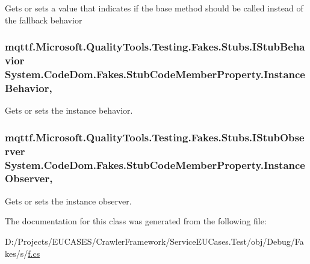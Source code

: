 Gets or sets a value that indicates if the base method should be called instead of the fallback behavior

\hypertarget{class_system_1_1_code_dom_1_1_fakes_1_1_stub_code_member_property_aa743e0a8ea935366aca0b719b1b58e38}{
\subsubsection[{Instance\-Behavior}]{\setlength{\rightskip}{0pt plus 5cm}mqttf.\-Microsoft.\-Quality\-Tools.\-Testing.\-Fakes.\-Stubs.\-I\-Stub\-Behavior System.\-Code\-Dom.\-Fakes.\-Stub\-Code\-Member\-Property.\-Instance\-Behavior\hspace{0.3cm}{\ttfamily [get]}, {\ttfamily [set]}}}\label{class_system_1_1_code_dom_1_1_fakes_1_1_stub_code_member_property_aa743e0a8ea935366aca0b719b1b58e38}


Gets or sets the instance behavior.

\hypertarget{class_system_1_1_code_dom_1_1_fakes_1_1_stub_code_member_property_a48a1bbe7b0424c96b2a2cee59c324fa0}{
\subsubsection[{Instance\-Observer}]{\setlength{\rightskip}{0pt plus 5cm}mqttf.\-Microsoft.\-Quality\-Tools.\-Testing.\-Fakes.\-Stubs.\-I\-Stub\-Observer System.\-Code\-Dom.\-Fakes.\-Stub\-Code\-Member\-Property.\-Instance\-Observer\hspace{0.3cm}{\ttfamily [get]}, {\ttfamily [set]}}}\label{class_system_1_1_code_dom_1_1_fakes_1_1_stub_code_member_property_a48a1bbe7b0424c96b2a2cee59c324fa0}


Gets or sets the instance observer.



The documentation for this class was generated from the following file\-:\begin{DoxyCompactItemize}
\item 
D\-:/\-Projects/\-E\-U\-C\-A\-S\-E\-S/\-Crawler\-Framework/\-Service\-E\-U\-Cases.\-Test/obj/\-Debug/\-Fakes/s/\hyperlink{s_2f_8cs}{f.\-cs}\end{DoxyCompactItemize}
